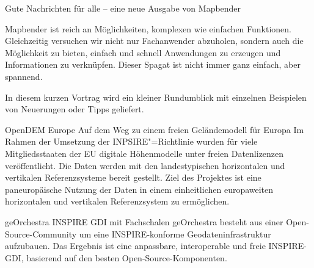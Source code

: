 %
{Gute Nachrichten für alle -- eine neue Ausgabe von Mapbender}%
{}%
{
Mapbender ist reich an Möglichkeiten, komplexen wie einfachen
Funktionen. Gleichzeitig versuchen wir nicht nur
Fachanwender abzuholen, sondern auch die Möglichkeit zu bieten, einfach und
schnell Anwendungen zu erzeugen und Informationen zu verknüpfen. Dieser
Spagat ist nicht immer ganz einfach, aber spannend.

In diesem kurzen Vortrag wird ein kleiner Rundumblick mit einzelnen
Beispielen von Neuerungen oder Tipps geliefert.%
}

%
{OpenDEM Europe}%
{Auf dem Weg zu einem freien Geländemodell für Europa}%
{
Im Rahmen der Umsetzung der INPSIRE"=Richtlinie wurden für viele Mitgliedsstaaten der EU
digitale Höhenmodelle unter freien Datenlizenzen veröffentlicht. Die Daten werden mit den
landestypischen horizontalen und vertikalen Referenzsysteme bereit gestellt. Ziel des Projektes ist
eine paneuropäische Nutzung der Daten in einem einheitlichen europaweiten horizontalen und
vertikalen Referenzsystem zu ermöglichen.%
}

%
{geOrchestra}%
{INSPIRE GDI mit Fachschalen}%
{
geOrchestra besteht aus einer Open-Source-Community um eine INSPIRE-konforme Geodateninfrastruktur
aufzubauen. Das Ergebnis ist eine anpassbare, interoperable und freie INSPIRE-GDI, basierend auf den
besten Open-Source-Komponenten.%
}

\label{bof-mittwoch}

\label{social-event}
\RaggedRight
{}
\justifying
